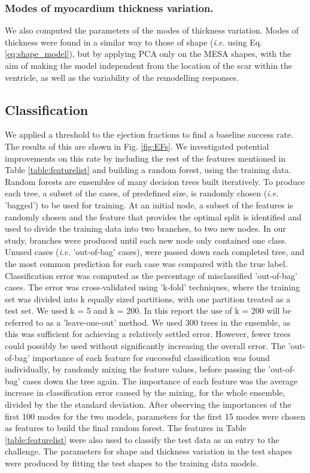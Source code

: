 \documentclass{llncs}
\begin{document}
\subsubsection{Modes of myocardium thickness variation.}
We also computed the parameters of the modes of thickness variation. Modes of thickness were found in a similar way to those of shape (\emph{i.e.} using Eq. \ref{eq:shape_model}), but by applying PCA only on the MESA shapes, with the aim of making the model independent from the location of the scar within the ventricle, as well as the variability of the remodelling responses.
	
	\subsection{Classification}
	\label{method:classification}
We applied a threshold to the ejection fractions to find a baseline success rate. The results of this are shown in Fig. \ref{fig:EFs}. We investigated potential improvements on this rate by including the rest of the features mentioned in Table \ref{table:featurelist} and building a random forest, using the training data. Random forests are ensembles of many decision trees built iteratively. To produce each tree, a subset of the cases, of predefined size, is randomly chosen (\emph{i.e.} 'bagged') to be used for training. At an initial node, a subset of the features is randomly chosen and the feature that provides the optimal split is identified and used to divide the training data into two branches, to two new nodes. In our study, branches were produced until each new node only contained one class. Unused cases (\emph{i.e.} 'out-of-bag' cases), were passed down each completed tree, and the most common prediction for each case was compared with the true label. Classification error was computed as the percentage of misclassified 'out-of-bag' cases. The error was cross-validated using 'k-fold' techniques, where the training set was divided into k equally sized partitions, with one partition treated as a test set. We used k = 5 and k = 200. In this report the use of k = 200 will be referred to as a 'leave-one-out' method. We used 300 trees in the ensemble, as this was sufficient for achieving a relatively settled error. However, fewer trees could possibly be used without significantly increasing the overall error. The 'out-of-bag' importance of each feature for successful classification was found individually, by randomly mixing the feature values, before passing the 'out-of-bag' cases down the tree again. The importance of each feature was the average increase in classification error caused by the mixing, for the whole ensemble, divided by the the standard deviation.
After observing the importances of the first 100 modes for the two models, parameters for the first 15 modes were chosen as features to build the final random forest. The features in Table \ref{table:featurelist} were also used to classify the test data as an entry to the challenge. The parameters for shape and thickness variation in the test shapes were produced by fitting the test shapes to the training data models.
\end{document}
